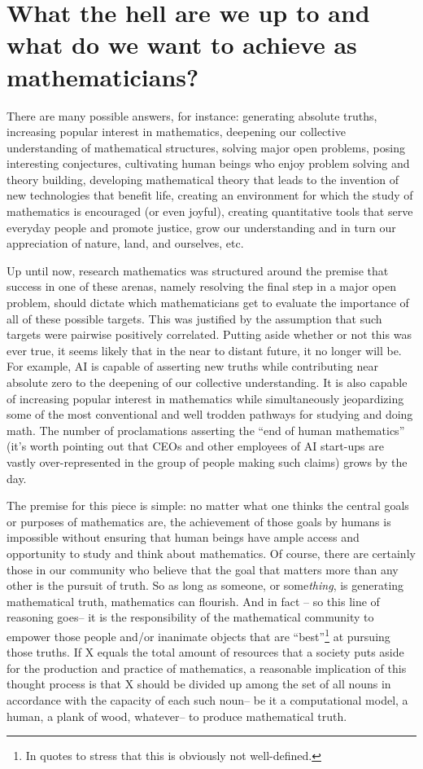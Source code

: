 \documentclass[11pt,reqno]{amsart}
\theoremstyle{plain}
\theoremstyle{definition}
\numberwithin{equation}{section}
\numberwithin{theorem}{section}
\begin{document}
\section{What the hell are we up to and what do we want to achieve as mathematicians?}

There are many possible answers, for instance: generating absolute truths, increasing popular interest in mathematics, deepening our collective understanding of mathematical structures, solving major open problems, posing interesting conjectures, cultivating human beings who enjoy problem solving and theory building, developing mathematical theory that leads to the invention of new technologies that benefit life, creating an environment for which the study of mathematics is encouraged (or even joyful), creating quantitative tools that serve everyday people and promote justice, grow our understanding and in turn our appreciation of nature, land, and ourselves, etc. 


Up until now, research mathematics was structured around the premise that success in one of these arenas, namely resolving the final step in a major open problem, should dictate which mathematicians get to evaluate the importance of all of these possible targets. This was justified by the assumption that such targets were pairwise positively correlated. Putting aside whether or not this was ever true, it seems likely that in the near to distant future, it no longer will be. For example, AI is capable of asserting new truths while contributing near absolute zero to the deepening of our collective understanding. It is also capable of increasing popular interest in mathematics while simultaneously jeopardizing some of the most conventional and well trodden pathways for studying and doing math. The number of proclamations asserting the ``end of human mathematics'' (it’s worth pointing out that CEOs and other employees of AI start-ups are vastly over-represented in the group of people making such claims) grows by the day. 


The premise for this piece is simple: no matter what one thinks the central goals or purposes of mathematics are, the achievement of those goals by humans is impossible without ensuring that human beings have ample access and opportunity to study and think about mathematics. Of course, there are certainly those in our community who believe that the goal that matters more than any other is the pursuit of truth. So as long as someone, or some\textit{thing}, is generating mathematical truth, mathematics can flourish. And in fact – so this line of reasoning goes– it is the responsibility of the mathematical community to empower those people and/or inanimate objects that are “best”\footnote{In quotes to stress that this is obviously not well-defined.} at pursuing those truths. If X equals the total amount of resources that a society puts aside for the production and practice of mathematics, a reasonable implication of this thought process is that X should be divided up among the set of all nouns in accordance with the capacity of each such noun– be it a computational model, a human, a plank of wood, whatever–  to produce mathematical truth. 
\end{document}
